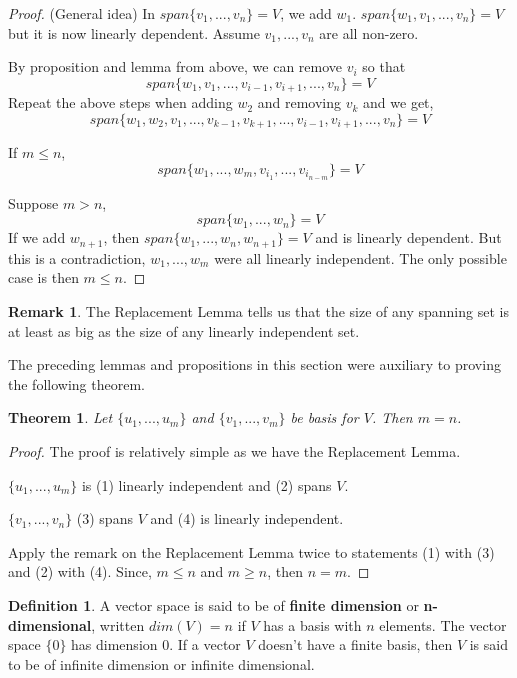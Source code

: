 \documentclass{report}
\newtheorem{_thm}{Theorem}
\theoremstyle{definition}
\newtheorem{_def}{Definition}
\newtheorem{_rem}{Remark}
\begin{document}
\begin{proof} (General idea)
In $span\{v_1,...,v_n\}=V$, we add $w_1$.
$span\{w_1,v_1,...,v_n\}=V$ but it is now linearly dependent.
Assume $v_1,...,v_n$ are all non-zero.

By proposition and lemma from above, we can remove $v_i$ so that
\[span\{w_1,v_1,...,v_{i-1},v_{i+1},...,v_n\}=V\]
Repeat the above steps when adding $w_2$ and removing $v_k$ and we get,
\[span\{w_1,w_2,v_1,...,v_{k-1},v_{k+1},...,v_{i-1},v_{i+1},...,v_n\}=V\]

If $m\leq n$,
\[span\{w_1,...,w_m,v_{i_1},...,v_{i_{n-m}}\}=V\]

Suppose $m>n$,
\[span\{w_1,...,w_n\}=V\]
If we add $w_{n+1}$, then $span\{w_1,...,w_n,w_{n+1}\}=V$ and is linearly dependent.
But this is a contradiction, $w_1,...,w_m$ were all linearly independent.
The only possible case is then $m\leq n$.
\end{proof}

\begin{_rem}
The Replacement Lemma tells us that the size of any spanning set is at least as big as the size of any linearly independent set.
\end{_rem}

The preceding lemmas and propositions in this section were auxiliary to proving the following theorem.

\begin{_thm}
Let $\{u_1,...,u_m\}$ and $\{v_1,...,v_m\}$ be basis for $V$.
Then $m=n$.
\end{_thm}

\begin{proof}
The proof is relatively simple as we have the Replacement Lemma.

$\{u_1,...,u_m\}$ is (1) linearly independent and (2) spans $V$.

$\{v_1,...,v_n\}$ (3) spans $V$ and (4) is linearly independent.

Apply the remark on the Replacement Lemma twice to statements (1) with (3) and (2) with (4).
Since, $m\leq n$ and $m\geq n$, then $n=m$.
\end{proof}

\begin{_def}
A vector space is said to be of \textbf{finite dimension} or \textbf{n-dimensional}, written $dim(V)=n$ if $V$ has a basis with $n$ elements.
The vector space $\{0\}$ has dimension $0$.
If a vector $V$ doesn't have a finite basis, then $V$ is said to be of infinite dimension or infinite dimensional.
\end{_def}
\end{document}
